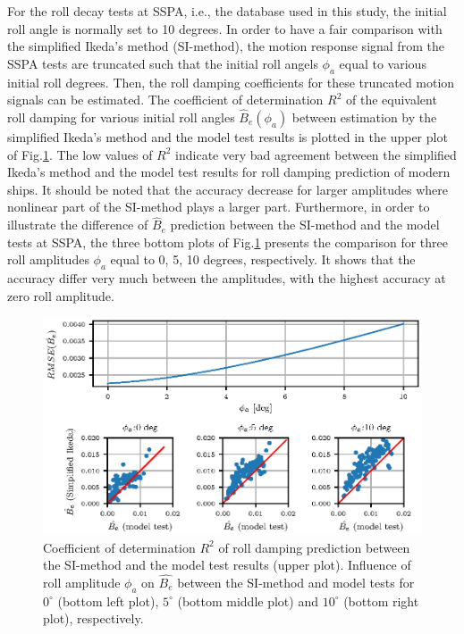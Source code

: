 For the roll decay tests at SSPA, i.e., the database used in this study, the initial roll angle is normally set to 10 degrees. In order to have a fair comparison with the simplified Ikeda's method (SI-method), the motion response signal from the SSPA tests are truncated such that the initial roll angels $\phi_a$ equal to various initial roll degrees. Then, the roll damping coefficients for these truncated motion signals can be estimated. The coefficient of determination $R^2$ of the equivalent roll damping for various initial roll angles $\hat{B}_e(\phi_a)$ between estimation by the simplified Ikeda's method and the model test results is plotted in the upper plot of Fig.\ref{fig:ikeda_phi_a}. The low values of $R^2$ indicate very bad agreement between the simplified Ikeda's method and the model test results for roll damping prediction of modern ships. It should be noted that the accuracy decrease for larger amplitudes where nonlinear part of the SI-method plays a larger part. Furthermore, in order to illustrate the difference of $\hat{B}_e$ prediction between the SI-method and the model tests at SSPA, the three bottom plots of Fig.\ref{fig:ikeda_phi_a} presents the comparison for three roll amplitudes $\phi_a$ equal to 0, 5, 10 degrees, respectively. It shows that the accuracy differ very much between the amplitudes, with the highest accuracy at zero roll amplitude. 


\begin{figure}[H]
\centering
  \centering
  \includegraphics[]{figures/ikeda_phi_a.eps}
  \vspace{-0.5cm}
  \caption{Coefficient of determination $R^2$ of roll damping prediction between the SI-method and the model test results (upper plot). Influence of roll amplitude $\phi_a$ on $\hat{B_e}$ between the SI-method and model tests for $0^{\circ}$ (bottom left plot), $5^{\circ}$ (bottom middle plot) and $10^{\circ}$ (bottom right plot), respectively.}
  \label{fig:ikeda_phi_a}
\end{figure}

